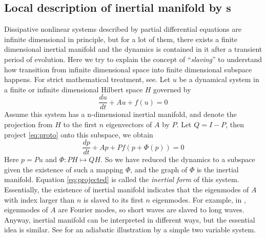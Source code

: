 \subsection{Local description of inertial manifold by \Fv s}
\label{subsec:LDIM}
Dissipative nonlinear systems described by partial differential equations
are infinite dimensional in principle, but for a lot of them, there exists
a finite dimensional inertial manifold and the dynamics is contained in it
after a transient period of evolution. Here we try to explain the concept of
``\emph{slaving}'' to understand how transition from infinite dimensional
space into finite dimensional subspace happens. For strict
mathematical treatment, see. Let $u$ be a dynamical
system in a finite or infinite dimensional Hilbert space $H$ governed by
\begin{equation}
  \label{eq:proto}
  \frac{du}{dt} + Au + f(u) = 0
\end{equation}
Assume this system has a n-dimensional inertial manifold, and
denote the projection from $H$ to the first $n$ eigenvectors of $A$ by
$P$. Let $Q = I - P$, then project \eqref{eq:proto} onto this subspace,
we obtain
\begin{equation}
  \label{eq:projected}
  \frac{dp}{dt} + Ap + Pf(p+\Phi(p)) = 0
\end{equation}
Here $p = Pu$ and $\Phi:PH\mapsto QH$. So we have reduced the dynamics to
a subspace given the existence of such a mapping $\Phi$, and the graph
of $\Phi$ is the inertial manifold. Equation \eqref{eq:projected} is
called the \emph{inertial form} of this system. Essentially, the existence
of inertial manifold indicates that the eigenmodes of $A$ with index larger than
$n$ is slaved to its first $n$ eigenmodes. For example, in \KSe,
eigenmodes of $A$ are Fourier modes, so short waves are slaved to long waves.
Anyway, inertial manifold can be interpreted in different ways, but the essential
idea is similar. See for an adiabatic illustration by a simple two
variable system.

